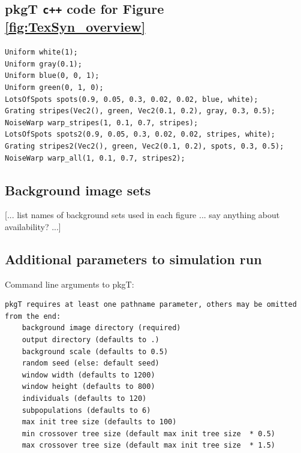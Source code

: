 \documentclass[acmtog]{acmart}
\newcommand{\texsyn}[0]{pkgT}
\begin{document}
\subsection{\texsyn{} \texttt{c++} code for Figure \ref{fig:TexSyn_overview}}
\begin{adjustwidth}{1cm}{0cm}
\begin{small}
\begin{verbatim}
Uniform white(1);
Uniform gray(0.1);
Uniform blue(0, 0, 1);
Uniform green(0, 1, 0);
LotsOfSpots spots(0.9, 0.05, 0.3, 0.02, 0.02, blue, white);
Grating stripes(Vec2(), green, Vec2(0.1, 0.2), gray, 0.3, 0.5);
NoiseWarp warp_stripes(1, 0.1, 0.7, stripes);
LotsOfSpots spots2(0.9, 0.05, 0.3, 0.02, 0.02, stripes, white);
Grating stripes2(Vec2(), green, Vec2(0.1, 0.2), spots, 0.3, 0.5);
NoiseWarp warp_all(1, 0.1, 0.7, stripes2);
\end{verbatim}
\end{small}
\end{adjustwidth}


\subsection{Background image sets}
[... list names of background sets used in each figure ... say anything about availability? ...]

\subsection{Additional parameters to simulation run}
Command line arguments to pkgT:
\begin{adjustwidth}{1cm}{0cm}
\begin{small}
\begin{verbatim}
pkgT requires at least one pathname parameter, others may be omitted from the end:
    background image directory (required)
    output directory (defaults to .)
    background scale (defaults to 0.5)
    random seed (else: default seed)
    window width (defaults to 1200)
    window height (defaults to 800)
    individuals (defaults to 120)
    subpopulations (defaults to 6)
    max init tree size (defaults to 100)
    min crossover tree size (default max init tree size  * 0.5)
    max crossover tree size (default max init tree size  * 1.5)
\end{verbatim}
\end{small}
\end{adjustwidth}
\end{document}
